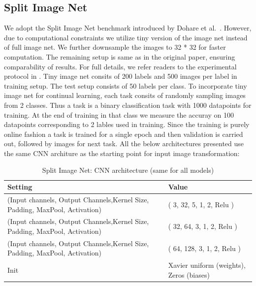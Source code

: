 \documentclass{article}
\begin{document}
\clearpage
\subsection{Split Image Net}
\label{sec:split_image_net_setup}
We adopt the Split Image Net benchmark introduced by Dohare et al.~\citep{dohare2024loss}. However, due to computational constraints we utilize 
tiny version of the image net instead of full image net. We further downsample the images to 32 * 32 for faster computation.
The remaining setup is same as in the original paper, ensuring comparability of results.  
For full details, we refer readers to the experimental protocol in \citep{dohare2024loss}.
Tiny image net consits of 200 labels and 500 images per label in training setup.
The test setup consists of 50 labels per class. 
To incorporate tiny image net for continual learning, each task consits of randomly sampling images from 2 classes. Thus a task is a binary classification task with 1000 datapoints for training. At the end of training in that class we measure the accuray on 100 datapoints corresponding to 2 lables used in training.
Since the training is purely online fashion a task is trained for a single epoch and then validation is carried out, followed by images for next task.
All the below architectures presented use the same CNN architure as the starting point for input image transformation:

\begin{table}[H]
\centering
\footnotesize
\caption{Split Image Net: CNN architecture (same for all models)}
\label{tab:split_image_net_cnn}
\begin{tabular}{@{}ll@{}}
\toprule
Setting & Value \\ \midrule
(Input channels, Output Channels,Kernel Size, Padding, MaxPool, Activation) & ( 3, 32, 5, 1, 2, Relu ) \\ 
(Input channels, Output Channels,Kernel Size, Padding, MaxPool, Activation) & ( 32, 64, 3, 1, 2, Relu ) \\ 
(Input channels, Output Channels,Kernel Size, Padding, MaxPool, Activation) & ( 64, 128, 3, 1, 2, Relu ) \\ 
Init & Xavier uniform (weights), Zeros (biases) \\
\bottomrule
\end{tabular}
\end{table}
\end{document}

